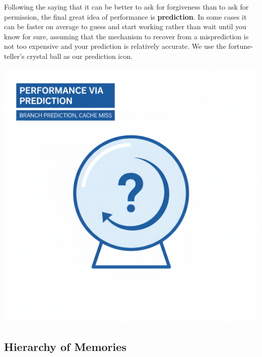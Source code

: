 \documentclass[a4paper,10pt]{article}
\begin{document}
\begin{minipage}[t]{0.7\linewidth}
Following the saying that it can be better to ask for forgiveness than to ask for permission, the final great idea of performance is \textbf{prediction}. In some cases it can be faster on average to guess and start working rather than wait until you know for sure, assuming that the mechanism to recover from a misprediction is not too expensive and your prediction is relatively accurate. We use the fortune-teller's crystal ball as our prediction icon.
\end{minipage}
\hfill
\begin{minipage}[t]{0.28\linewidth}
    \centering
    \includegraphics[width=\linewidth]{resources/8_great_ideas_of_computer_architecture/perf_via_prediction.png}
\end{minipage}

\bigskip

\subsection{Hierarchy of Memories}
\end{document}
